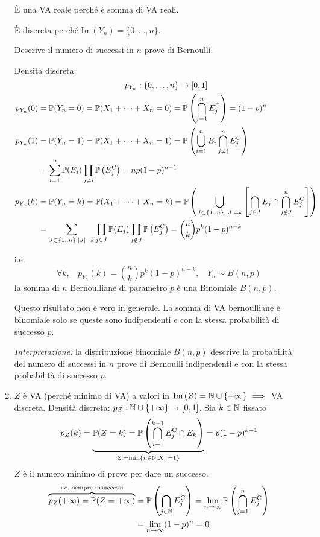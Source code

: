 \begin{enumerate}
È una VA reale perché è somma di VA reali.

È discreta perché $\mathrm{Im}(Y_{n}) =\{0,\dots ,n\}$.

Descrive il numero di successi in $n$ prove di Bernoulli.

Densità discreta:
\begin{gather*}
p_{Y_{n}} :\{0,\dots ,n\}\rightarrow [0,1]\\
\begin{aligned}
p_{Y_{n}}(0) & =\mathbb{P}(Y_{n} =0) =\mathbb{P}(X_{1} +\cdots +X_{n} =0) =\mathbb{P}\left(\bigcap_{j=1}^{n} E_{j}^{\mathrm{C}}\right) =(1-p)^{n}\\
p_{Y_{n}}(1) & =\mathbb{P}(Y_{n} =1) =\mathbb{P}(X_{1} +\cdots +X_{n} =1) =\mathbb{P}\left(\bigcup_{i=1}^{n} E_{i}\bigcap_{j\neq i}^{n} E_{j}^{\mathrm{C}}\right)\\
 & =\sum\limits_{i=1}^{n}\mathbb{P}(E_{i})\prod_{j\neq i}\mathbb{P}\left(E_{j}^{\mathrm{C}}\right) =np(1-p)^{n-1}\\
p_{Y_{n}}(k) & =\mathbb{P}(Y_{n} =k) =\mathbb{P}(X_{1} +\cdots +X_{n} =k) =\mathbb{P}\left(\bigcup\limits_{J\subset \{1..n\} ,| J| =k}\left[\bigcap_{j\in J} E_{j} \cap \bigcap_{j\notin J}^{n} E_{j}^{\mathrm{C}}\right]\right)\\
 & =\sum\limits_{J\subset \{1..n\} ,| J| =k}\prod_{j\in J} \mathbb{P}(E_{j})\prod_{j\notin J}\mathbb{P}\left(E_{j}^{\mathrm{C}}\right) =\binom{n}{k} p^{k}(1-p)^{n-k}
\end{aligned}
\end{gather*}

i.e.
\begin{equation*}
\forall k,\ \ \ \ p_{Y_{n}}\left(k\right) =\binom{n}{k} p^{k}\left(1-p\right)^{n-k} ,\ \ \ \ Y_{n} \sim B\left(n,p\right)
\end{equation*}
la somma di $n$ Bernoulliane di parametro $p$ è una Binomiale $B\left(n,p\right)$.
\begin{oss}
Questo risultato non è vero in generale. La somma di VA bernoulliane è binomiale solo se queste sono indipendenti e con la stessa probabilità di successo $p$.
\end{oss}

\textit{Interpretazione:} la distribuzione binomiale $B\left(n,p\right)$ descrive la probabilità del numero di successi in $n$ prove di Bernoulli indipendenti e con la stessa probabilità di successo $p$.
\item $Z$ è VA (perché minimo di VA) a valori in $\mathrm{Im}\left(Z\right) =\mathbb{N} \cup \left\{+\infty \right\} \implies $ VA discreta. Densità discreta: $p_{Z} :\mathbb{N} \cup \left\{+\infty \right\}\rightarrow \left[0,1\right]$. Sia $k\in \mathbb{N}$ fissato
\begin{equation*}
p_{Z}(k) =\underbrace{\mathbb{P}(Z=k) =\mathbb{P}\left(\bigcap\limits_{j=1}^{k-1} E_{j}^{\mathrm{C}} \cap E_{k}\right)}_{Z\coloneqq \min\{n\in \mathbb{N} :X_{n} =1\}} =p(1-p)^{k-1}
\end{equation*}
$Z$ è il numero minimo di prove per dare un successo.
\begin{align*}
\overbrace{p_{Z}(+\infty) =\mathbb{P}(Z=+\infty)}^{\text{i.e. sempre insuccessi}} & =\mathbb{P}\left(\bigcap_{j\in \mathbb{N}} E_{j}^{\mathrm{C}}\right) =\lim_{n\rightarrow \infty }\mathbb{P}\left(\bigcap_{j=1}^{n} E_{j}^{\mathrm{C}}\right)\\
 & =\lim_{n\rightarrow \infty }(1-p)^{n} =0
\end{align*}


\end{enumerate}
